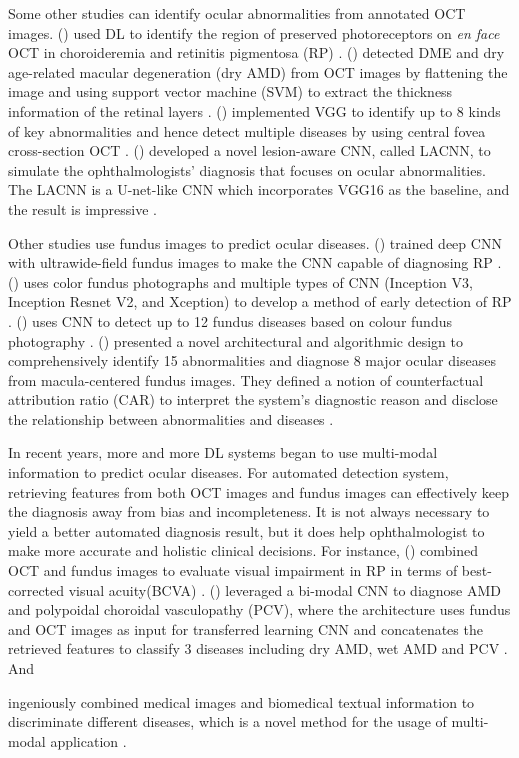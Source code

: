 \documentclass{article}
\newcommand{\authyear}[1]{\citeauthor{#1} (\citeyear{#1})}
\begin{document}
\begin{multicols}{2}
	Some other studies can identify ocular abnormalities from annotated OCT images.
	\authyear{camino2018deep} used DL to identify the region of preserved photoreceptors on \textit{en face} OCT in choroideremia and retinitis pigmentosa (RP) \autocite{camino2018deep}. 
	\authyear{srinivasan2014fully} detected DME and dry age-related macular degeneration (dry AMD) from OCT images by flattening the image and using support vector machine (SVM) to extract the thickness information of the retinal layers \autocite{srinivasan2014fully}. 
	\authyear{leandro2023oct} implemented VGG to identify up to 8 kinds of key abnormalities and hence detect multiple diseases by using central fovea cross-section OCT \autocite{leandro2023oct}. \authyear{Fang_Wang2019} developed a novel lesion-aware CNN, called LACNN, to simulate the ophthalmologists' diagnosis that focuses on ocular abnormalities. The LACNN is a U-net-like CNN which incorporates VGG16 as the baseline, and the result is impressive \autocite{Fang_Wang2019}.
	
	Other studies use fundus images to predict ocular diseases.
	\authyear{masumoto2019accuracy} trained deep CNN with ultrawide-field fundus images to make the CNN capable of diagnosing RP \autocite{masumoto2019accuracy}. 
	\authyear{chen2021artificial} uses color fundus photographs and multiple types of CNN (Inception V3, Inception Resnet V2, and Xception) to develop a method of early detection of RP \autocite{chen2021artificial}. 
	\authyear{li2022development} uses CNN to detect up to 12 fundus diseases based on colour fundus photography \autocite{li2022development}. \authyear{Son2023} presented a novel architectural and algorithmic design to comprehensively identify 15 abnormalities and diagnose 8 major ocular diseases from macula-centered fundus images. They defined a notion of counterfactual attribution ratio (CAR) to interpret the system's diagnostic reason and disclose the relationship between abnormalities and diseases \autocite{Son2023}.
	
	In recent years, more and more DL systems began to use multi-modal information to predict ocular diseases. For automated detection system, retrieving features from both OCT images and fundus images can effectively keep the diagnosis away from bias and incompleteness. It is not always necessary to yield a better automated diagnosis result, but it does help ophthalmologist to make more accurate and holistic clinical decisions. For instance, \authyear{liu2023prediction} combined OCT and fundus images to evaluate visual impairment in RP in terms of best-corrected visual acuity(BCVA) \autocite{liu2023prediction}. \authyear{Xu2021} leveraged a bi-modal CNN to diagnose AMD and polypoidal choroidal vasculopathy (PCV), where the architecture uses fundus and OCT images as input for transferred learning CNN and concatenates the retrieved features to classify 3 diseases including dry AMD, wet AMD and PCV \autocite{Xu2021}. And \author{Andrearczyk2018} ingeniously combined medical images and biomedical textual information to discriminate different diseases, which is a novel method for the usage of multi-modal application \autocite{Andrearczyk2018}.
	

\end{multicols}
\end{document}

